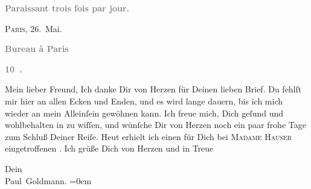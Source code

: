 \pstart
           \begin{otherlanguage}{french}\textcolor{gray}{\textbf{\textbf{Paraissant trois fois par jour.}}}\end{otherlanguage}\hfill \textsc{Paris}, 26. Mai.\pend
           
\pstart
           \begin{otherlanguage}{french}\textcolor{gray}{\textbf{\textbf{Bureau à Paris}}}\end{otherlanguage}\pend
           
\pstart
           \begin{otherlanguage}{french}\textcolor{gray}{\textbf{\textbf{10 .}}}\end{otherlanguage}\pend
           
\pstart\center{}Mein lieber Freund,\pend\vspace{0.5em}
\pstart
           Ich danke Dir von Herzen für Deinen lieben Brief. Du fehlſt mir hier an allen Ecken
               und Enden, und es wird lange dauern, bis ich mich wieder an mein Alleinſein gewöhnen
               kann. Ich freue mich, Dich geſund und wohlbehalten in \label{K_L02813-1v}\label{K_L02813-1} zu wiſſen, und wünſche Dir von Herzen
               noch ein paar frohe Tage zum Schluß Deiner Reiſe. Heut
               erhielt ich einen für Dich bei \textsc{Madame Hauser} eingetroffenen \label{K_L02813-2v}\label{K_L02813-2}. Ich grüße Dich von Herzen und in
               Treue\pend
           
\pstart
           Dein {\\[\baselineskip]}\spacefill\mbox{Paul Goldmann.}\pend
           \leftskip=0em{}\endnumbering{}  \newcommand{\dateiname}{L02813}\newcommand{\titel}{Paul Goldmann an Arthur Schnitzler, 26. 5. [1897]}\newcommand{\editorInnen}{Martin Anton Müller und Laura Untner}
